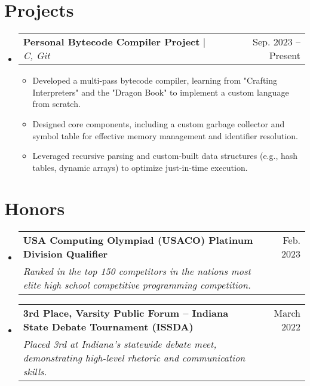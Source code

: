 \documentclass[letterpaper,11pt]{article}
\makeatletter
\newcommand{\resumeItem}[1]{
  \item\small{
    {#1 \vspace{-2pt}}
  }
}
\newcommand{\resumeSubheading}[4]{
  \vspace{-2pt}\item
    \begin{tabular*}{0.97\textwidth}[t]{l@{\extracolsep{\fill}}r}
      \textbf{#1} & #2 \\
      \textit{\small#3} & \textit{\small #4} \\
    \end{tabular*}\vspace{-7pt}
}
\newcommand{\resumeProjectHeading}[2]{
    \item
    \begin{tabular*}{0.97\textwidth}{l@{\extracolsep{\fill}}r}
      \small#1 & #2 \\
    \end{tabular*}\vspace{-7pt}
}
\newcommand{\resumeSubHeadingListStart}{\begin{itemize}[leftmargin=0.15in, label={}]}
\newcommand{\resumeSubHeadingListEnd}{\end{itemize}}
\newcommand{\resumeItemListStart}{\begin{itemize}}
\newcommand{\resumeItemListEnd}{\end{itemize}\vspace{-5pt}}
\makeatother
\begin{document}
\section{Projects}
    \resumeSubHeadingListStart
      \begin{comment}
      \resumeProjectHeading
          {\textbf{NBA Game Prediction Model} $|$ \emph{Python, PyTorch, scikit-learn, NumPy, Pandas}}{July 2024 -- Present}
          \resumeItemListStart
            \resumeItem{Designed a NBA outcome prediction model in Python using a Random Forest of Decision Trees, achiving 65.2\% accuracy (surpassing Vegas odds at 64.3\%).}
            \resumeItem{Optimized proformance through hyperperameter tuning, regularization, and feature engineering.}
          \resumeItemListEnd
      \end{comment}
      \resumeProjectHeading
          {\textbf{Personal Bytecode Compiler Project} $|$ \emph{C, Git}}{Sep. 2023 -- Present}
          \resumeItemListStart
            \resumeItem{Developed a multi-pass bytecode compiler, learning from "Crafting Interpreters" and the "Dragon Book" to implement a custom language from scratch.}
            \resumeItem{Designed core components, including a custom garbage collector and symbol table for effective memory management and identifier resolution.}
            \resumeItem{Leveraged recursive parsing and custom-built data structures (e.g., hash tables, dynamic arrays) to optimize just-in-time execution.}
          \resumeItemListEnd
    \resumeSubHeadingListEnd

\section{Honors}
    \resumeSubHeadingListStart
    \resumeSubheading
    {USA Computing Olympiad (USACO) Platinum Division Qualifier}{Feb. 2023}
    {Ranked in the top 150 competitors in the nations most elite high school competitive programming competition.}{}
    \resumeSubheading
    {3rd Place, Varsity Public Forum – Indiana State Debate Tournament (ISSDA)}{March 2022}
    {Placed 3rd at Indiana’s statewide debate meet, demonstrating high-level rhetoric and communication skills.}{}
    \resumeSubHeadingListEnd

%
\end{document}

